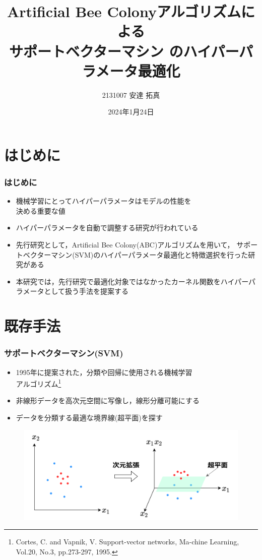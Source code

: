 \documentclass[11pt,dvipdfmx,cjk]{beamer}
\title{Artificial Bee Colonyアルゴリズムによる\\サポートベクターマシン
のハイパーパラメータ最適化}
\author{2131007 安達 拓真}
\institute{千葉工業大学 情報科学部 情報工学科 4年 山口研究室}
\date{2024年1月24日}
\begin{document}

\begin{frame}
\maketitle
\end{frame}

\section{はじめに}

\begin{frame}
  \frametitle{はじめに}
  \begin{itemize}
    \item 機械学習にとってハイパーパラメータはモデルの性能を\\決める重要な値
    \item ハイパーパラメータを自動で調整する研究が行われている
    \item 先行研究として，Artificial Bee Colony(ABC)アルゴリズムを用いて，
    サポートベクターマシン(SVM)のハイパーパラメータ最適化と特徴選択を行った研究がある
    \item 本研究では，先行研究で最適化対象ではなかったカーネル関数をハイパーパラメータとして扱う手法を提案する
  \end{itemize}
\end{frame}
\section{既存手法} %
\begin{frame}
\frametitle{サポートベクターマシン(SVM)}
\begin{itemize}
    \item 1995年に提案された，分類や回帰に使用される機械学習\\アルゴリズム\footnote{ Cortes, C. and Vapnik, V. Support-vector networks, Ma-chine Learning, Vol.20, No.3, pp.273-297, 1995.}
    \item 非線形データを高次元空間に写像し，線形分離可能にする 
    \item データを分類する最適な境界線(超平面)を探す                
  \end{itemize}
  \begin{figure}
    \centering
    \includegraphics[width=0.8\linewidth]{syazou.png}
   \end{figure}
\end{frame}
\end{document}
